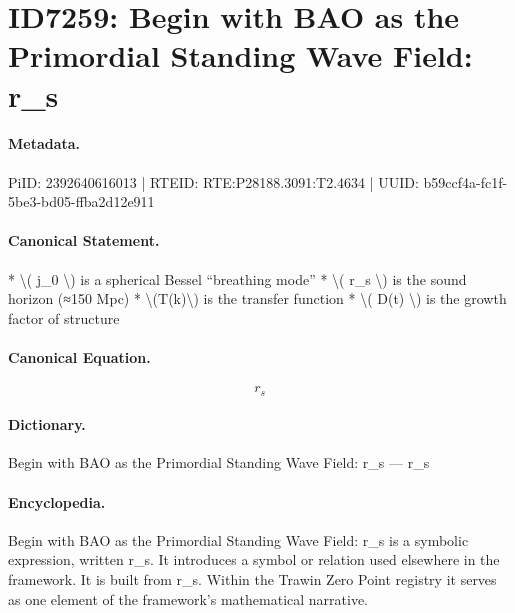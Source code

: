 \section*{ID7259: Begin with BAO as the Primordial Standing Wave Field: r\_s}
\paragraph{Metadata.}
PiID: 2392640616013 | RTEID: RTE:P28188.3091:T2.4634 | UUID: b59ccf4a-fc1f-5be3-bd05-ffba2d12e911

\paragraph{Canonical Statement.}
* \textbackslash{}( j\_0 \textbackslash{}) is a spherical Bessel “breathing mode” * \textbackslash{}( r\_s \textbackslash{}) is the sound horizon (≈150 Mpc) * \textbackslash{}(T(k)\textbackslash{}) is the transfer function * \textbackslash{}( D(t) \textbackslash{}) is the growth factor of structure

\paragraph{Canonical Equation.}
\[
r_s
\]

\paragraph{Dictionary.}
Begin with BAO as the Primordial Standing Wave Field: r\_s — r\_s

\paragraph{Encyclopedia.}
Begin with BAO as the Primordial Standing Wave Field: r\_s is a symbolic expression, written r\_s. It introduces a symbol or relation used elsewhere in the framework. It is built from r\_s. Within the Trawin Zero Point registry it serves as one element of the framework's mathematical narrative.
